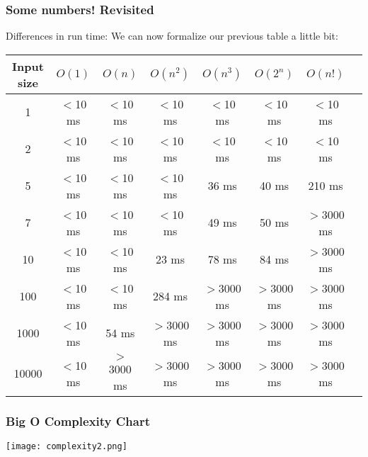\begin{frame}
	\frametitle{Some numbers! Revisited}
	
Differences in run time:		We can now formalize our previous table a little bit:
		

		\begin{tabular}{c | c c c c c c c}
			\scriptsize
			Input size & \alert{$O(1)$} & \alert{$O(n)$} & \alert{$O(n^2)$} & \alert{$O(n^3)$} & \alert{$O(2^n)$} & \alert{$O(n!)$} \\
			\midrule
			1 & $<$10 ms & $<$10 ms & $<$10 ms & $<$10 ms & $<$10 ms & $<$10 ms\\
			2 & $<$10 ms & $<$10 ms & $<$10 ms & $<$10 ms & $<$10 ms & $<$10 ms\\
			5 & $<$10 ms & $<$10 ms & $<$10 ms & 36 ms & 40 ms & 210 ms\\
			7 & $<$10 ms & $<$10 ms & $<$10 ms & 49 ms & 50 ms & $>$3000 ms \\
			10 & $<$10 ms & $<$10 ms & 23 ms & 78 ms & 84 ms & $>$3000 ms\\
			100 & $<$10 ms & $<$10 ms & 284 ms & $>$3000 ms & $>$3000 ms & $>$3000 ms \\
			1000 & $<$10 ms & 54 ms & $>$3000 ms &$>$3000 ms & $>$3000 ms & $>$3000 ms \\
			10000 & $<$10 ms &  $>$3000 ms &$>$3000 ms &$>$3000 ms & $>$3000 ms & $>$3000 ms \\
		\end{tabular}
\end{frame}

\begin{frame}[fragile]
	\frametitle{Big O Complexity Chart}

	
\begin{center}
\texttt{[image: complexity2.png]}
\end{center}


\end{frame}


